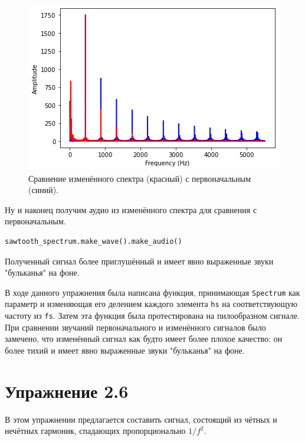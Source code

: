 \documentclass[a4paper, 14pt]{extarticle}
\begin{document}
    \begin{figure}[H]
        \centering
        \includegraphics[width=0.8\linewidth]{resources/Images/task5_compare_spectrum}
        \caption{Сравнение изменённого спектра (красный) с первоначальным (синий).}
        \label{fig:task5_compare_spectrum}
    \end{figure}

    Ну и наконец получим аудио из изменённого спектра для сравнения с первоначальным.

    \begin{lstlisting}[caption= Получение аудио., label={lst:task5_new_wave_audio}]
sawtooth_spectrum.make_wave().make_audio()
    \end{lstlisting}

    Полученный сигнал более приглушённый и имеет явно выраженные звуки "бульканья" на фоне.

    В ходе данного упражнения была написана функция, принимающая \texttt{Spectrum} как параметр и изменяющая его
    делением каждого элемента \texttt{hs} на соответствующую частоту из \texttt{fs}.
    Затем эта функция была протестирована на пилообразном сигнале.
    При сравнении звучаний первоначального и изменённого сигналов было замечено, что изменённый сигнал как будто имеет
    более плохое качество: он более тихий и имеет явно выраженные звуки "бульканья" на фоне.

    \newpage

    \section{Упражнение 2.6}
    \label{sec:task6}

    В этом упражнении предлагается составить сигнал, состоящий из чётных и нечётных гармоник, спадающих пропорционально $1/f^2$.
\end{document}
